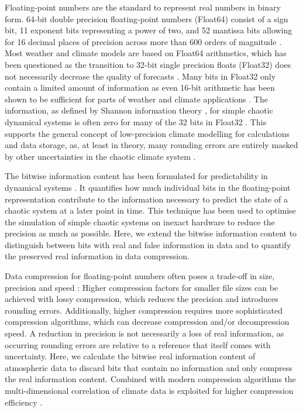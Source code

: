 Floating-point numbers are the standard to represent real numbers in binary form. 64-bit double precision floating-point
numbers (Float64) consist of a sign bit, 11 exponent bits representing a power of two, and 52 mantissa bits allowing for
16 decimal places of precision across more than 600 orders of magnitude \citep{IEEE1985}. Most weather and climate
models are based on Float64 arithmetics, which has been questioned as the transition to 32-bit single precision floats
(Float32) does not necessarily decrease the quality of forecasts \citep{Vana2017,TintoPrims2019}. Many bits in Float32
only contain a limited amount of information as even 16-bit arithmetic has been shown to be sufficient for parts of weather
and climate applications \citep{Hatfield2019,Klower2020b,Ackmann2021,Dawson2018,Fan2019}.
The information, as defined by Shannon information theory \citep{Shannon1948,MacKay2003a,Kleeman2011},
for simple chaotic dynamical systems is often zero for many of the 32 bits in Float32 \citep{Jeffress2017a}.
This supports the general concept of low-precision climate modelling for calculations and data storage, as, at least in theory,
many rounding errors are entirely masked by other uncertainties in the chaotic climate system
\citep{Palmer2014a,Palmer2015}.

The bitwise information content has been formulated for predictability in dynamical systems \citep{Jeffress2017a}.
It quantifies how much individual bits in the floating-point representation contribute to the information necessary
to predict the state of a chaotic system at a later point in time. This technique has been used to optimise the
simulation of simple chaotic systems on inexact hardware to reduce the precision as much as possible. Here, we
extend the bitwise information content to distinguish between bits with real and false information in data and to
quantify the preserved real information in data compression. 

Data compression for floating-point numbers often poses a trade-off in size, precision and speed
\citep{Silver2017,Kuhn2016a,Hubbe2013}:
Higher compression factors for smaller file sizes can be achieved with lossy compression, which reduces
the precision and introduces rounding errors. Additionally, higher compression requires more sophisticated
compression algorithms, which can decrease compression and/or decompression speed. A reduction in
precision is not necessarily a loss of real information, as occurring rounding errors are relative to a reference
that itself comes with uncertainty. Here, we calculate the bitwise real information content \citep{Shannon1948,Jeffress2017a,Kleeman2011}
of atmospheric data to discard bits that contain no information \citep{Zender2016,Kouznetsov2020} and only compress the real
information content. Combined with modern compression algorithms \citep{Lindstrom2014,Lindstrom2006} the multi-dimensional
correlation of climate data is exploited for higher compression efficiency \citep{Baker2016,Baker2019,Woodring2011}.

